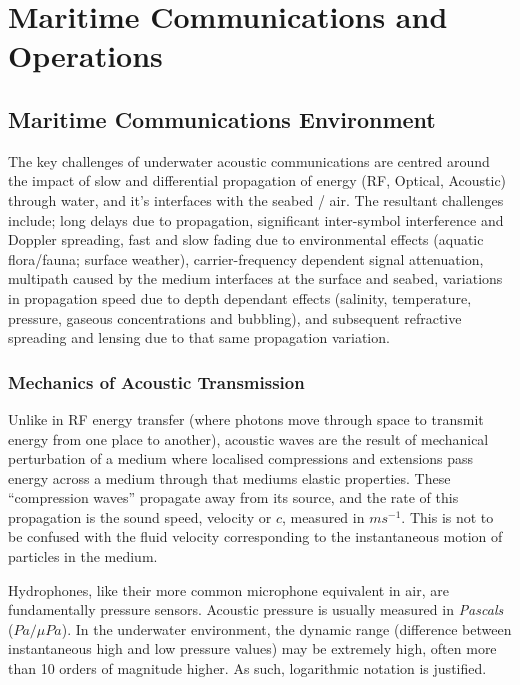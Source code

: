 \chapter{Maritime Communications and Operations}
\label{ch:maritime_background}

\section{Maritime Communications Environment}\label{sec:marine_comms}

The key challenges of underwater acoustic communications are centred around the impact of slow and differential propagation of energy (RF, Optical, Acoustic) through water, and it's interfaces with the seabed / air.
The resultant challenges include; long delays due to propagation, significant inter-symbol interference and Doppler spreading, fast and slow fading due to environmental effects (aquatic flora/fauna; surface weather), carrier-frequency dependent signal attenuation, multipath caused by the medium interfaces at the surface and seabed, variations in propagation speed due to depth dependant effects (salinity, temperature, pressure, gaseous concentrations and bubbling), and subsequent refractive spreading and lensing due to that same propagation variation\cite{Partan2006}.

\subsection{Mechanics of Acoustic Transmission}

Unlike in RF energy transfer (where photons move through space to transmit energy from one place to another), acoustic waves are the result of mechanical perturbation of a medium where localised compressions and extensions pass energy across a medium through that mediums elastic properties.
These ``compression waves'' propagate away from its source, and the rate of this propagation is the sound speed, velocity or $c$, measured in $ms^{-1}$.
This is not to be confused with the fluid velocity corresponding to the instantaneous motion of particles in the medium.

Hydrophones, like their more common microphone equivalent in air, are fundamentally pressure sensors.
Acoustic pressure is usually measured in \emph{Pascals} ($Pa/\mu Pa$). 
In the underwater environment, the dynamic range (difference between instantaneous high and low pressure values) may be extremely high, often more than 10 orders of magnitude higher. 
As such, logarithmic notation is justified.

